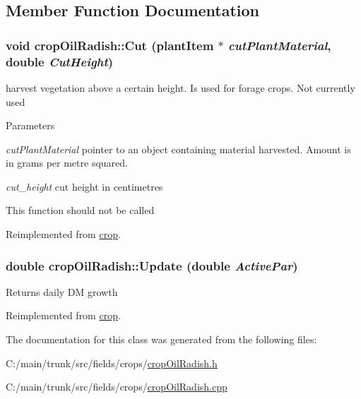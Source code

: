\subsection{Member Function Documentation}
\hypertarget{classcrop_oil_radish_a3e3ded25f3277d7b8b24fb70900f5138}{
\subsubsection[{Cut}]{\setlength{\rightskip}{0pt plus 5cm}void cropOilRadish::Cut ({\bf plantItem} $\ast$ {\em cutPlantMaterial}, \/  double {\em CutHeight})}}
\label{classcrop_oil_radish_a3e3ded25f3277d7b8b24fb70900f5138}


harvest vegetation above a certain height. Is used for forage crops. Not currently used 
\begin{DoxyParams}{Parameters}
\item[{\em cutPlantMaterial}]pointer to an object containing material harvested. Amount is in grams per metre squared. \item[{\em cut\_\-height}]cut height in centimetres\end{DoxyParams}
This function should not be called 

Reimplemented from \hyperlink{classcrop_a5b2a6a3522c64790e295055ff164dc10}{crop}.\hypertarget{classcrop_oil_radish_aa699ab0f332d4a9eba58255b99fe2ea2}{
\subsubsection[{Update}]{\setlength{\rightskip}{0pt plus 5cm}double cropOilRadish::Update (double {\em ActivePar})}}
\label{classcrop_oil_radish_aa699ab0f332d4a9eba58255b99fe2ea2}
Returns daily DM growth 

Reimplemented from \hyperlink{classcrop_a9ed02462e332fffb65498075e7499bf4}{crop}.

The documentation for this class was generated from the following files:\begin{DoxyCompactItemize}
\item 
C:/main/trunk/src/fields/crops/\hyperlink{crop_oil_radish_8h}{cropOilRadish.h}\item 
C:/main/trunk/src/fields/crops/\hyperlink{crop_oil_radish_8cpp}{cropOilRadish.cpp}\end{DoxyCompactItemize}
